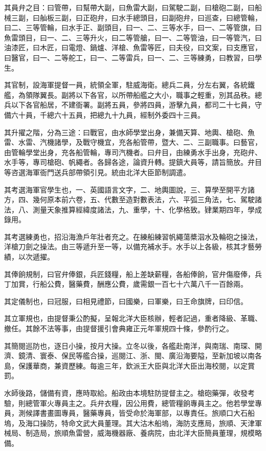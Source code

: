\begin{pinyinscope}
其員弁之目：曰管帶，曰幫帶大副，曰魚雷大副，曰駕駛二副，曰槍砲二副，曰船械三副，曰舢板三副，曰正砲弁，曰水手總頭目，曰副砲弁，曰巡查，曰總管輪，曰二、三等管輪，曰水手正、副頭目，曰一、二、三等水手，曰一、二等管旗，曰魚雷頭目，曰一、二、三等升火，曰二等管艙，曰一、二等管油，曰一等管汽，曰油漆匠，曰木匠，曰電燈、鍋爐、洋槍、魚雷等匠，曰夫役，曰文案，曰支應官，曰醫官，曰一、二等舵工，曰一、二等雷兵，曰一、二、三等練勇，曰教習，曰學生。

其官制，設海軍提督一員，統領全軍，駐威海衛。總兵二員，分左右翼，各統鐵艦，為領隊翼長。副將以下各官，以所帶船艦之大小，職事之輕重，別其品秩。總兵以下各官船居，不建衙署。副將五員，參將四員，游擊九員，都司二十七員，守備六十員，千總六十五員，把總九十九員，經制外委四十三員。

其升擢之階，分為三途：曰戰官，由水師學堂出身，兼備天算、地輿、槍砲、魚雷、水雷、汽機諸學，及戰守機宜，充各船管帶，暨大、二、三副職事。曰藝官，由管輪學堂出身，充各船管輪，專司汽機者。曰弁目，由練勇水手出身，充砲弁、水手等，專司槍砲、帆繩者。各歸各途，論資升轉。提鎮大員等，請旨簡放。弁目等咨選海軍衙門送兵部帶領引見。統由北洋大臣節制調遣。

其考選海軍官學生也，一、英國語言文字，二、地輿圖說，三、算學至開平方諸方，四、幾何原本前六卷，五、代數至造對數表法，六、平弧三角法，七、駕駛諸法，八、測量天象推算經緯度諸法，九、重學，十、化學格致。肄業期四年，學成錄用。

其考選練勇也，招沿海漁戶年壯者充之。在練船練習帆繩蕩槳泅水及輪砲之操法，洋槍刀劍之操法。由三等遞升至一等，以備充補水手。水手以上各級，核其才藝勞績，以次遞擢。

其俸餉規制，曰官弁俸銀，兵匠錢糧，船上差缺薪糧，各船俸餉，官弁傷廢俸，兵丁加賞，行船公費，醫藥費，酬應公費，歲需銀一百七十六萬八千一百餘兩。

其定儀制也，曰冠服，曰相見禮節，曰國樂，曰軍樂，曰王命旗牌，曰印信。

其立軍規也，由提督秉公酌擬，呈報北洋大臣核辦，輕者記過，重者降級、革職、撤任。其餘不法等事，由提督援引會典雍正元年軍規四十條，參酌行之。

其簡閱巡防也，逐日小操，按月大操。立冬以後，各艦赴南洋，與南瑞、南琛、開濟、鏡清、寰泰、保民等艦合操，巡閱江、浙、閩、廣沿海要隘，至新加坡以南各島，保護華商，兼資歷練。每逾三年，欽派王大臣與北洋大臣出海校閱，以定賞罰。

水師後路，儲備有資，應時取給。船政由本境駐防提督主之。槍砲藥彈，收發考驗，則總管軍火專員主之。兵弁衣糧，因公用費，總管糧餉專員主之。他若學堂專員，測候譯書畫圖專員，醫藥專員，皆受命於海軍部，以專責任。旅順口大石船塢，及海口操防，特命文武大員董理。其大沽木船塢，海防支應局，旅順、天津軍械局、制造局，旅順魚雷營，威海機器廠、養病院，由北洋大臣簡員董理，規模略備。


\end{pinyinscope}
